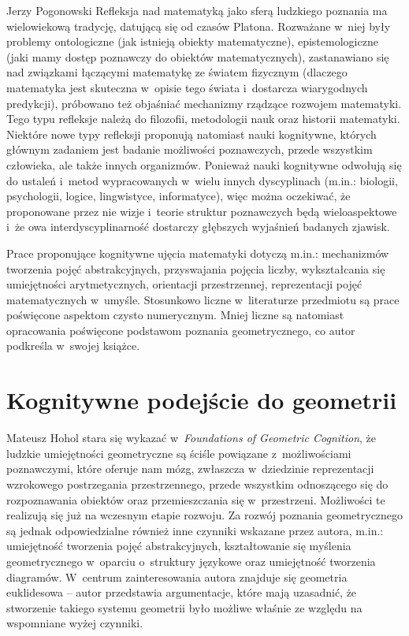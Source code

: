 \begin{newrevplenv}{Jerzy Pogonowski}
Refleksja nad matematyką jako sferą ludzkiego poznania ma
wielowiekową tradycję, datującą się od czasów Platona. Rozważane w~niej były problemy ontologiczne (jak istnieją obiekty
matematyczne), epistemologiczne (jaki mamy dostęp poznawczy do
obiektów matematycznych), zastanawiano się nad związkami łączącymi
matematykę ze światem fizycznym (dlaczego matematyka jest
skuteczna w~opisie tego świata i~dostarcza wiarygodnych
predykcji), próbowano też objaśniać mechanizmy rządzące rozwojem
matematyki. Tego typu refleksje należą do filozofii, metodologii
nauk oraz historii matematyki. Niektóre nowe typy refleksji
proponują natomiast nauki kognitywne, których głównym zadaniem
jest badanie możliwości poznawczych, przede wszystkim człowieka,
ale także innych organizmów. Ponieważ nauki kognitywne odwołują
się do ustaleń i~metod wypracowanych w~wielu innych dyscyplinach
(m.in.: biologii, psychologii, logice, lingwistyce, informatyce),
więc można oczekiwać, że proponowane przez nie wizje i~teorie
struktur poznawczych będą wieloaspektowe i~że owa
interdyscyplinarność dostarczy głębszych wyjaśnień badanych
zjawisk.

Prace proponujące kognitywne ujęcia matematyki dotyczą m.in.:
mechanizmów tworzenia pojęć abstrakcyjnych, przyswajania pojęcia
liczby, wykształcania się umiejętności arytmetycznych, orientacji
przestrzennej, reprezentacji pojęć matematycznych w~umyśle. Stosunkowo
liczne w~literaturze przedmiotu są prace poświęcone aspektom
czysto numerycznym. Mniej liczne są natomiast opracowania
poświęcone podstawom poznania geometrycznego, co autor podkreśla w~swojej książce.

\section{Kognitywne podejście do geometrii}

Mateusz Hohol stara się wykazać w~{\em Foundations of Geometric
Cognition}, że ludzkie umiejętności geometryczne są ściśle
powiązane z~możliwościami poznawczymi, które oferuje nam mózg,
zwłaszcza w~dziedzinie reprezentacji wzrokowego postrzegania
przestrzennego, przede wszystkim odnoszącego się do rozpoznawania
obiektów oraz przemieszczania się w~przestrzeni. Możliwości te
realizują się już na wczesnym etapie rozwoju. Za rozwój poznania
geometrycznego są jednak odpowiedzialne również inne czynniki
wskazane przez autora, m.in.: umiejętność tworzenia pojęć
abstrakcyjnych, kształtowanie się myślenia geometrycznego w~oparciu o~struktury językowe oraz umiejętność tworzenia diagramów.
W~centrum zainteresowania autora znajduje się geometria
euklidesowa -- autor przedstawia argumentacje, które mają
uzasadnić, że stworzenie takiego systemu geometrii było możliwe
właśnie ze względu na wspomniane wyżej czynniki.


\end{newrevplenv}
